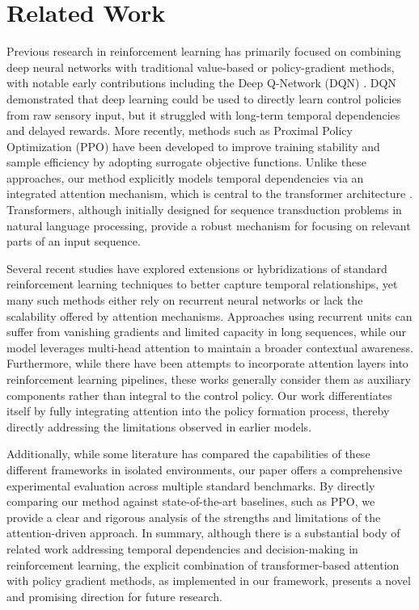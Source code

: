 \documentclass{article}
\begin{document}
\section{Related Work}
Previous research in reinforcement learning has primarily focused on combining deep neural networks with traditional value-based or policy-gradient methods, with notable early contributions including the Deep Q-Network (DQN) . DQN demonstrated that deep learning could be used to directly learn control policies from raw sensory input, but it struggled with long-term temporal dependencies and delayed rewards. More recently, methods such as Proximal Policy Optimization (PPO)  have been developed to improve training stability and sample efficiency by adopting surrogate objective functions. Unlike these approaches, our method explicitly models temporal dependencies via an integrated attention mechanism, which is central to the transformer architecture \cite{ashish_2017_attention}. Transformers, although initially designed for sequence transduction problems in natural language processing, provide a robust mechanism for focusing on relevant parts of an input sequence.

Several recent studies have explored extensions or hybridizations of standard reinforcement learning techniques to better capture temporal relationships, yet many such methods either rely on recurrent neural networks or lack the scalability offered by attention mechanisms. Approaches using recurrent units can suffer from vanishing gradients and limited capacity in long sequences, while our model leverages multi-head attention to maintain a broader contextual awareness. Furthermore, while there have been attempts to incorporate attention layers into reinforcement learning pipelines, these works generally consider them as auxiliary components rather than integral to the control policy. Our work differentiates itself by fully integrating attention into the policy formation process, thereby directly addressing the limitations observed in earlier models.

Additionally, while some literature has compared the capabilities of these different frameworks in isolated environments, our paper offers a comprehensive experimental evaluation across multiple standard benchmarks. By directly comparing our method against state-of-the-art baselines, such as PPO, we provide a clear and rigorous analysis of the strengths and limitations of the attention-driven approach. In summary, although there is a substantial body of related work addressing temporal dependencies and decision-making in reinforcement learning, the explicit combination of transformer-based attention with policy gradient methods, as implemented in our framework, presents a novel and promising direction for future research.
\end{document}
